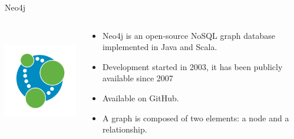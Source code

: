 \begin{frame}{Neo4j}
    \begin{columns}
      \begin{column}{0.25\textwidth}
        \includegraphics[height=1.8in]{img/neo4j.png}
      \end{column}
      \begin{column}{0.6\textwidth}
        \begin{itemize}
          \item Neo4j is an open-source NoSQL graph database implemented in Java and Scala.
          \vspace{0.25cm}
          \item Development started in 2003, it has been publicly available since 2007
          \vspace{0.25cm}
          \item Available on GitHub.
          \vspace{0.25cm}
          \item A graph is composed of two elements: a node and a relationship.
        \end{itemize}
      \end{column}
    \end{columns}
\end{frame}


